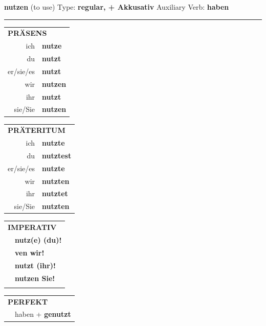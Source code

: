 \documentclass[10pt,a4paper]{revtex4-2}
\begin{document}
\begin{verbbox-acc}
    {\Large \bf nutzen} (to use) \hfill Type: \textbf{regular, + Akkusativ} \hfill Auxiliary Verb: \textbf{haben} 
    
     \vspace{5pt}

    \hrule
    
    \vspace{5pt}

  \begin{tabular}{rl}
     \multicolumn{2}{l}{\textbf{PRÄSENS} }\\
    ich & \textbf{nutze}\\
    du & \textbf{nutzt}\\
    er/sie/es & \textbf{nutzt}\\
    wir & \textbf{nutzen}\\
    ihr & \textbf{nutzt}\\
    sie/Sie & \textbf{nutzen}\\
  \end{tabular}
  \hfill
     \begin{tabular}{rl}
    \multicolumn{2}{l}{\textbf{PRÄTERITUM} }\\
    ich & \textbf{nutzte}\\
    du & \textbf{nutztest}\\
    er/sie/es & \textbf{nutzte}\\
    wir & \textbf{nutzten}\\
    ihr & \textbf{nutztet}\\
    sie/Sie & \textbf{nutzten}\\
  \end{tabular}
  \hfill
  \begin{tabular}{rl}
     \multicolumn{2}{l}{\textbf{IMPERATIV} }\\
   & \textbf{nutz(e) (du)!}\\
   & \textbf{ven wir!}\\
   & \textbf{nutzt (ihr)!}\\
   & \textbf{nutzen Sie!}\\
   & \vspace{10pt}
  \end{tabular}

    \vspace{10pt}

 \begin{tabular}{rl}
     \multicolumn{2}{l}{\textbf{PERFEKT}}\\
  &  haben + \textbf{genutzt}\\
  \end{tabular}
\hfill
   \begin{tabular}{rl}
   

\end{tabular}
\end{verbbox-acc}
\end{document}
